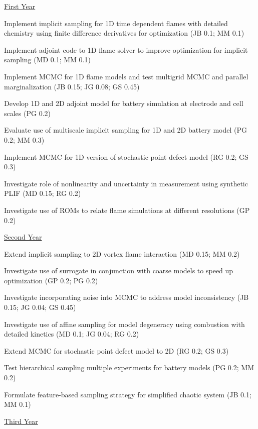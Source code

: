 \documentclass[11pt]{article}
\begin{document}
\underline{First Year}
\begin{compactitem}
\setlength{\itemsep}{0pt}\setlength{\parskip}{0pt}\setlength{\parsep}{0pt}
\item Implement implicit sampling for 1D time dependent flames with detailed chemistry using finite difference derivatives for optimization
(JB 0.1; MM 0.1)
\item Implement adjoint code to 1D flame solver to improve optimization for implicit sampling
(MD 0.1; MM 0.1)
\item Implement MCMC for 1D flame models and test multigrid MCMC and parallel marginalization
(JB 0.15; JG 0.08; GS 0.45)
\item Develop 1D and 2D adjoint model for battery simulation at electrode and cell scales
(PG 0.2)
\item Evaluate use of multiscale implicit sampling for 1D and 2D battery model
(PG 0.2; MM 0.3)
\item Implement MCMC for 1D version of stochastic point defect model
(RG 0.2; GS 0.3)
\item Investigate role of nonlinearity and uncertainty in measurement using synthetic PLIF
(MD 0.15; RG 0.2)
\item Investigate use of ROMs to relate flame simulations at different resolutions
(GP 0.2)
\end{compactitem}
%
\underline{Second Year}
\begin{compactitem}
\setlength{\itemsep}{0pt}\setlength{\parskip}{0pt}\setlength{\parsep}{0pt}
\item Extend implicit sampling to 2D vortex flame interaction
(MD 0.15; MM 0.2)
\item Investigate use of surrogate in conjunction with coarse models to speed up optimization
(GP 0.2; PG 0.2)
\item Investigate incorporating noise into MCMC to address model inconsistency
(JB 0.15; JG 0.04; GS 0.45)
\item Investigate use of affine sampling for model degeneracy using combustion with detailed kinetics
(MD 0.1; JG 0.04; RG 0.2)
\item Extend MCMC for stochastic point defect model to 2D
(RG 0.2; GS 0.3)
\item Test hierarchical sampling multiple experiments for battery models
(PG 0.2; MM 0.2)
\item Formulate feature-based sampling strategy for simplified chaotic system
(JB 0.1; MM 0.1)
\end{compactitem}
%
\underline{Third Year}
\end{document}

